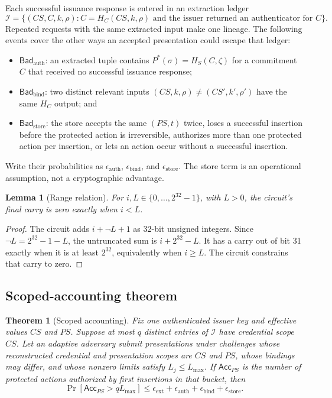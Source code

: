 \documentclass[11pt]{article}
\newcommand{\Bad}{\mathsf{Bad}}
\newcommand{\Issued}{\mathcal{I}}
\newtheorem{theorem}{Theorem}
\newtheorem{lemma}{Lemma}
\theoremstyle{remark}
\begin{document}
Each successful issuance response is entered in an extraction ledger
\[
  \Issued=\{(CS,C,k,\rho):
      C=H_C(CS,k,\rho)
      \text{ and the issuer returned an authenticator for }C\}.
\]
Repeated requests with the same extracted input make one lineage. The
following events cover the other ways an accepted presentation could escape
that ledger:
\begin{itemize}
  \item $\Bad_{\mathrm{auth}}$: an extracted tuple contains
        $P^*(\sigma)=H_S(C,\zeta)$ for a commitment $C$ that received no
        successful issuance response;
  \item $\Bad_{\mathrm{bind}}$: two distinct relevant inputs
        $(CS,k,\rho)\ne(CS',k',\rho')$ have the same $H_C$ output; and
  \item $\Bad_{\mathrm{store}}$: the store accepts the same $(PS,t)$ twice,
        loses a successful insertion before the protected action is
        irreversible, authorizes more than one protected action per
        insertion, or lets an action occur without a successful insertion.
\end{itemize}
Write their probabilities as $\epsilon_{\mathrm{auth}}$,
$\epsilon_{\mathrm{bind}}$, and $\epsilon_{\mathrm{store}}$. The store term is
an operational assumption, not a cryptographic advantage.

\begin{lemma}[Range relation]
\label{lem:range}
For $i,L\in\{0,\ldots,2^{32}-1\}$, with $L>0$, the circuit's final carry is
zero exactly when $i<L$.
\end{lemma}

\begin{proof}
The circuit adds $i+\neg L+1$ as 32-bit unsigned integers. Since
$\neg L=2^{32}-1-L$, the untruncated sum is $i+2^{32}-L$. It has a carry out
of bit 31 exactly when it is at least $2^{32}$, equivalently when $i\geq L$.
The circuit constrains that carry to zero.
\end{proof}

\subsection{Scoped-accounting theorem}

\begin{theorem}[Scoped accounting]
\label{thm:accounting}
Fix one authenticated issuer key and effective values $CS$ and $PS$. Suppose
at most $q$ distinct entries of $\Issued$ have credential scope $CS$. Let an
adaptive adversary submit presentations under challenges whose reconstructed
credential and presentation scopes are $CS$ and $PS$, whose bindings may
differ, and whose nonzero limits satisfy $L_j\leq L_{\max}$. If
$\mathsf{Acc}_{PS}$ is the number of protected actions authorized by first
insertions in that bucket, then
\[
 \Pr[\mathsf{Acc}_{PS}>qL_{\max}]
 \leq
 \epsilon_{\mathrm{ext}}+
 \epsilon_{\mathrm{auth}}+
 \epsilon_{\mathrm{bind}}+
 \epsilon_{\mathrm{store}}.
\]
\end{theorem}
\end{document}
